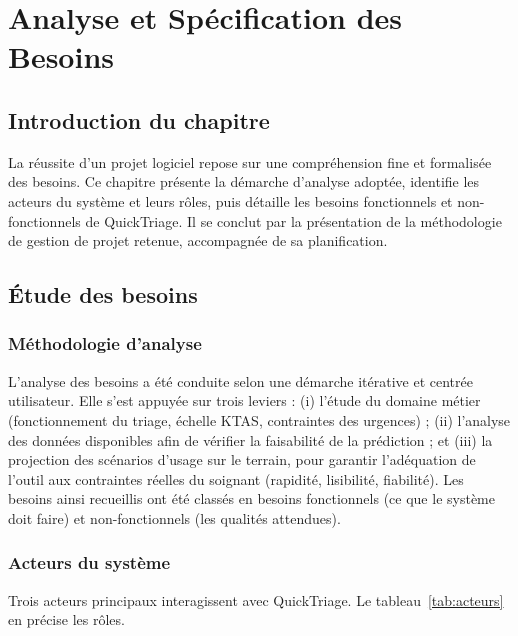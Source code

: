 \chapter{Analyse et Spécification des Besoins}

\section*{Introduction du chapitre}
La réussite d'un projet logiciel repose sur une compréhension fine et formalisée des
besoins. Ce chapitre présente la démarche d'analyse adoptée, identifie les acteurs du
système et leurs rôles, puis détaille les besoins fonctionnels et non-fonctionnels de
QuickTriage. Il se conclut par la présentation de la méthodologie de gestion de projet
retenue, accompagnée de sa planification.

\section{Étude des besoins}

\subsection{Méthodologie d'analyse}
L'analyse des besoins a été conduite selon une démarche itérative et centrée utilisateur.
Elle s'est appuyée sur trois leviers : (i) l'étude du domaine métier (fonctionnement du
triage, échelle KTAS, contraintes des urgences) ; (ii) l'analyse des données disponibles
afin de vérifier la faisabilité de la prédiction ; et (iii) la projection des scénarios
d'usage sur le terrain, pour garantir l'adéquation de l'outil aux contraintes réelles du
soignant (rapidité, lisibilité, fiabilité). Les besoins ainsi recueillis ont été classés en
besoins fonctionnels (ce que le système doit faire) et non-fonctionnels (les qualités
attendues).

\subsection{Acteurs du système}
Trois acteurs principaux interagissent avec QuickTriage. Le tableau~\ref{tab:acteurs} en
précise les rôles.

